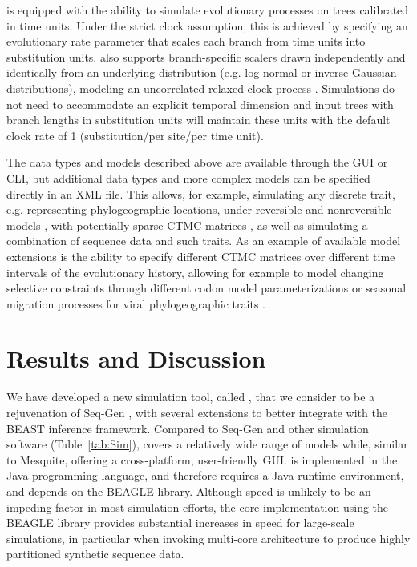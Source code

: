 {\bussname} is equipped with the ability to simulate evolutionary processes on trees calibrated in time units. 
Under the strict clock assumption, this is achieved by specifying an evolutionary rate parameter that scales each branch from time units into substitution units.
{\bussname} also supports branch-specific scalers drawn independently and identically from an underlying distribution (e.g. log normal or inverse Gaussian distributions), modeling an uncorrelated relaxed clock process \cite{Drummond2006}.
Simulations do not need to accommodate an explicit temporal dimension and input trees with branch lengths in substitution units will maintain these units with the default clock rate of 1 (substitution/per site/per time unit).

The data types and models described above are available through the {\bussname} GUI or CLI, but additional data types and more complex models can be specified directly in an XML file.
This allows, for example, simulating any discrete trait, e.g. representing phylogeographic locations, under reversible and nonreversible models \cite{Lemey2009,Edwards2011}, with potentially sparse CTMC matrices \cite{Lemey2009}, as well as simulating a combination of sequence data and such traits.
As an example of available model extensions is the ability to specify different CTMC matrices over different time intervals of the evolutionary history, allowing for example to model changing selective constraints through different codon model parameterizations or seasonal migration processes for viral phylogeographic traits \citep{Bielejec2014a}.

\section{Results and Discussion}

We have developed a new simulation tool, called {\bussname}, that we consider to be a rejuvenation of Seq-Gen \citep{Rambaut1997}, with several extensions to better integrate with the BEAST inference framework.
Compared to Seq-Gen and other simulation software (Table~\ref{tab:Sim}), {\bussname} covers a relatively wide range of models while, similar to Mesquite, offering a cross-platform, user-friendly GUI.
{\bussname} is implemented in the Java programming language, and therefore requires a Java runtime environment, and depends on the BEAGLE library.
Although speed is unlikely to be an impeding factor in most simulation efforts, the core implementation using the BEAGLE library provides substantial increases in speed for large-scale simulations, in particular when invoking multi-core architecture to produce highly partitioned synthetic sequence data.

